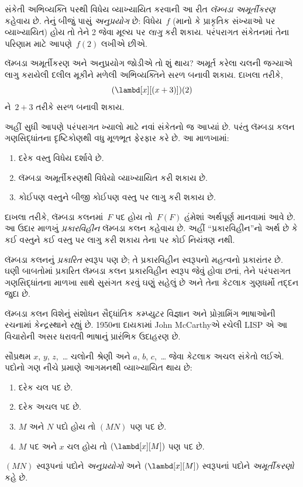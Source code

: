 સંકેતી અભિવ્યક્તિ પરથી વિધેય વ્યાખ્યાયિત કરવાની આ રીત
\emph{લૅમ્બડા અમૂર્તીકરણ} કહેવાય છે. તેનું બીજું પાસું
\emph{અનુપ્રયોગ} છે: વિધેય~$f$ (માનો કે પ્રાકૃતિક સંખ્યાઓ પર
વ્યાખ્યાયિત) હોય તો તેને 2 જેવા મૂલ્ય પર \emph{લાગુ} કરી શકાય.
પરંપરાગત સંકેતનમાં તેના પરિણામ માટે આપણે~$f(2)$ લખીએ છીએ.

લૅમ્બડા અમૂર્તીકરણ અને અનુપ્રયોગ જોડીએ તો શું થાય? અમૂર્ત કરેલા
ચલની જગ્યાએ લાગુ કરાયેલી દલીલ મૂકીને મળેલી અભિવ્યક્તિને સરળ બનાવી
શકાય. દાખલા તરીકે,
\[
(\lambd[x][(x + 3)])(2)
\]
ને~$2 + 3$ તરીકે સરળ બનાવી શકાય.

અહીં સુધી આપણે પરંપરાગત ખ્યાલો માટે નવાં સંકેતનો જ આપ્યાં છે.
પરંતુ લૅમ્બડા કલન ગણસિદ્ધાંતના દૃષ્ટિકોણથી વધુ મૂળભૂત ફેરફાર
કરે છે. આ માળખામાં:
\begin{enumerate}
\item દરેક વસ્તુ વિધેય દર્શાવે છે.
\item લૅમ્બડા અમૂર્તીકરણથી વિધેયો વ્યાખ્યાયિત કરી શકાય છે.
\item કોઈપણ વસ્તુને બીજી કોઈપણ વસ્તુ પર લાગુ કરી શકાય છે.
\end{enumerate}
દાખલા તરીકે, લૅમ્બડા કલનમાં~$F$ પદ હોય તો~$F(F)$ હંમેશાં અર્થપૂર્ણ
માનવામાં આવે છે. આ ઉદાર માળખું \emph{પ્રકારવિહીન} લૅમ્બડા કલન
કહેવાય છે. અહીં ``પ્રકારવિહીન''નો અર્થ છે કે કઈ વસ્તુને કઈ વસ્તુ
પર લાગુ કરી શકાય તેના પર કોઈ નિયંત્રણ નથી.

\begin{digress}
લૅમ્બડા કલનનું \emph{પ્રકારિત} સ્વરૂપ પણ છે; તે પ્રકારવિહીન
સ્વરૂપનો મહત્વનો પ્રકારાંતર છે. ઘણી બાબતોમાં પ્રકારિત લૅમ્બડા કલન
પ્રકારવિહીન સ્વરૂપ જેવું હોવા છતાં, તેને પરંપરાગત ગણસિદ્ધાંતના
માળખા સાથે સુસંગત કરવું ઘણું સહેલું છે અને તેના કેટલાક ગુણધર્મો
તદ્દન જુદા છે.

લૅમ્બડા કલન વિશેનું સંશોધન સૈદ્ધાંતિક કમ્પ્યુટર વિજ્ઞાન અને
પ્રોગ્રામિંગ ભાષાઓની રચનામાં કેન્દ્રસ્થાને રહ્યું છે. 1950ના
દાયકામાં John McCarthyએ રચેલી LISP એ આ વિચારોની અસર ધરાવતી
ભાષાનું પ્રારંભિક ઉદાહરણ છે.
\end{digress}
\endgroup


\begingroup
\makeatletter{}\makeatother

\label{guunit:OLP-0344}


સૌપ્રથમ $x$, $y$, $z$,~\dots{} ચલોની શ્રેણી અને
$a$, $b$, $c$,~\dots{} જેવા કેટલાક અચલ સંકેતો લઈએ. પદોનો ગણ
નીચે પ્રમાણે આગમનથી વ્યાખ્યાયિત થાય છે:
\begin{enumerate}
\item દરેક ચલ પદ છે.
\item દરેક અચલ પદ છે.
\item $M$ અને $N$ પદો હોય તો $(MN)$ પણ પદ છે.
\item $M$ પદ અને $x$ ચલ હોય તો $(\lambd[x][M])$ પણ પદ છે.
\end{enumerate}
$(MN)$ સ્વરૂપનાં પદોને \emph{અનુપ્રયોગો} અને
$(\lambd[x][M])$ સ્વરૂપનાં પદોને \emph{અમૂર્તીકરણો} કહે છે.

